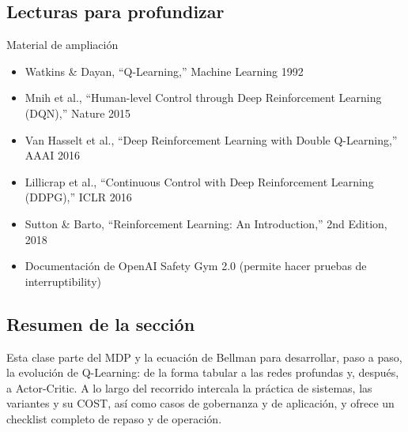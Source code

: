 \documentclass[a4paper]{article}
\begin{document}
\subsection{Lecturas para profundizar}

\begin{knowledgebox}{Material de ampliación}
\begin{itemize}
    \item Watkins \& Dayan, ``Q-Learning,'' Machine Learning 1992
    \item Mnih et al., ``Human-level Control through Deep Reinforcement Learning (DQN),'' Nature 2015
    \item Van Hasselt et al., ``Deep Reinforcement Learning with Double Q-Learning,'' AAAI 2016
    \item Lillicrap et al., ``Continuous Control with Deep Reinforcement Learning (DDPG),'' ICLR 2016
    \item Sutton \& Barto, ``Reinforcement Learning: An Introduction,'' 2nd Edition, 2018
    \item Documentación de OpenAI Safety Gym 2.0 (permite hacer pruebas de interruptibility)
\end{itemize}
\end{knowledgebox}

\subsection{Resumen de la sección}

Esta clase parte del MDP y la ecuación de Bellman para desarrollar, paso a paso, la evolución de Q-Learning: de la forma tabular a las redes profundas y, después, a Actor-Critic. A lo largo del recorrido intercala la práctica de sistemas, las variantes y su COST, así como casos de gobernanza y de aplicación, y ofrece un checklist completo de repaso y de operación.
\end{document}
